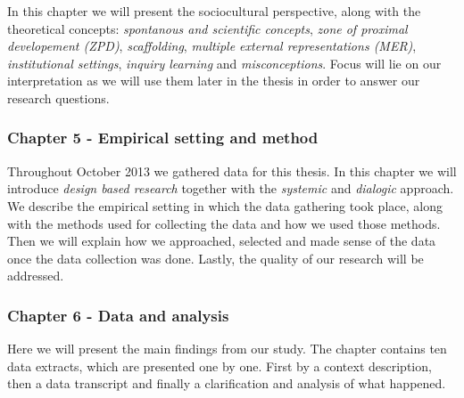 In this chapter we will present the sociocultural perspective, along with the theoretical concepts: \emph{spontanous and scientific concepts}, \emph{zone of proximal developement (ZPD)}, \emph{scaffolding}, \emph{multiple external representations (MER)}, \emph{institutional settings}, \emph{inquiry learning} and \emph{misconceptions}. Focus will lie on our interpretation as we will use them later in the thesis in order to answer our research questions. 

\subsubsection*{Chapter 5 - Empirical setting and method}

Throughout October 2013 we gathered data for this thesis. In this chapter we will introduce \emph{design based research} together with the \emph{systemic} and \emph{dialogic} approach. We describe the empirical setting in which the data gathering took place, along with the methods used for collecting the data and how we used those methods. Then we will explain how we approached, selected and made sense of the data once the data collection was done. Lastly, the quality of our research will be addressed. 

\subsubsection*{Chapter 6 - Data and analysis}
Here we will present the main findings from our study. The chapter contains ten data extracts, which are presented one by one. First by a context description, then a data transcript and finally a clarification and analysis of what happened. 

